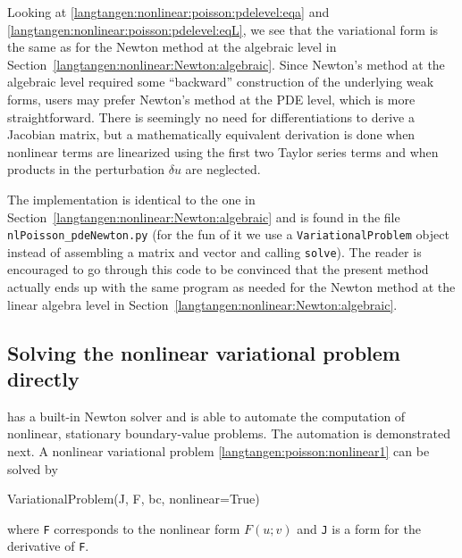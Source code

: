 Looking at \eqref{langtangen:nonlinear:poisson:pdelevel:eqa} and
\eqref{langtangen:nonlinear:poisson:pdelevel:eqL}, we see that the variational
form is the same as for the Newton method at the algebraic level
in Section~\ref{langtangen:nonlinear:Newton:algebraic}. Since Newton's method
at the algebraic level required some ``backward'' construction of the
underlying weak forms, \fenics{} users may prefer Newton's method at
the PDE level, which is more straightforward.
There is seemingly no need for differentiations to derive
a Jacobian matrix,
but a mathematically equivalent derivation is done when nonlinear terms are
linearized using the first two Taylor series terms and when 
products in the perturbation $\delta u$ are neglected.

The implementation is identical to the one in 
Section~\ref{langtangen:nonlinear:Newton:algebraic} and is found in
the file {\fontsize{10pt}{10pt}\verb!nlPoisson_pdeNewton.py!} (for the fun of it we use
a {\fontsize{10pt}{10pt}\texttt{VariationalProblem}} object instead of assembling a matrix and
vector and calling {\fontsize{10pt}{10pt}\texttt{solve}}). The reader is encouraged to go
through this code to be convinced that the present method actually
ends up with the same program as needed for the Newton method at
the linear algebra level in Section~\ref{langtangen:nonlinear:Newton:algebraic}.


\subsection{Solving the nonlinear variational problem directly}
\label{langtangen:nonlinear:Newton:auto}

\dolfin{} has a built-in Newton solver and is able to automate the
computation of nonlinear, stationary boundary-value problems.
The automation is demonstrated next. A nonlinear variational
problem \eqref{langtangen:poisson:nonlinear1} can be solved by
\begin{python}
VariationalProblem(J, F, bc, nonlinear=True)
\end{python}
where {\fontsize{10pt}{10pt}\texttt{F}} corresponds to the nonlinear form $F(u;v)$ and
{\fontsize{10pt}{10pt}\texttt{J}} is a form for the derivative of {\fontsize{10pt}{10pt}\texttt{F}}.

